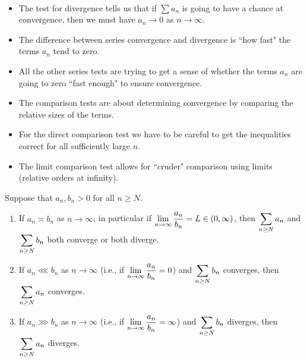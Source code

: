 \begin{remark}\,
\begin{itemize}
\item The test for divergence tells us that if $\sum a_n$ is going to have a chance at convergence, then we must have $a_n\to 0$ as $n\to\infty$.
\item The difference between series convergence and divergence is ``how fast" the terms $a_n$ tend to zero.
\item All the other series tests are trying to get a sense of whether the terms $a_n$ are going to zero ``fast enough" to ensure convergence.
\item The comparison tests are about determining convergence by comparing the relative sizes of the terms.
\item For the direct comparison test we have to be careful to get the inequalities correct for all sufficiently large $n$.
\item The limit comparison test allows for ``cruder" comparison using limits (relative orders at infinity).
\end{itemize}
\end{remark}

\begin{theorem}
Suppose that $a_n, b_n>0$ for all $n\ge N$.
\begin{enumerate}
\item If $a_n\asymp b_n$ as $n\to\infty$, in particular if $\displaystyle\lim_{n\to\infty}\frac{a_n}{b_n}=L\in (0,\infty)$, 
then $\displaystyle\sum_{n\ge N} a_n$ and $\displaystyle\sum_{n\ge N} b_n$ both converge or both diverge.
\item If $a_n\lll b_n$ as $n\to\infty$ (i.e., if $\displaystyle\lim_{n\to\infty}\frac{a_n}{b_n}=0$) and $\displaystyle\sum_{n\ge N} b_n$ converges, then $\displaystyle\sum_{n\ge N} a_n$ converges.
\item If $a_n\ggg b_n$ as $n\to\infty$ (i.e., if $\displaystyle\lim_{n\to\infty}\frac{a_n}{b_n}=\infty$) and $\displaystyle\sum_{n\ge N} b_n$ diverges, then $\displaystyle\sum_{n\ge N} a_n$ diverges.
\end{enumerate}
\end{theorem}

\newpage

